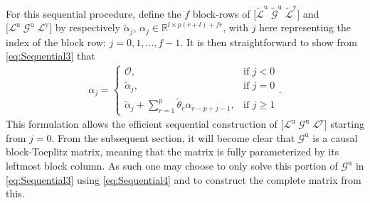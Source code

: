 For this sequential procedure, define the $f$ block-rows of $\big[\widetilde{\mathcal{L}}^\mathrm{u} \; \widetilde{\mathcal{G}}^\mathrm{u} \; \widetilde{\mathcal{L}}^\mathrm{y}\big]$ and $\big[\mathcal{L}^\mathrm{u} \; \mathcal{G}^\mathrm{u} \; \mathcal{L}^\mathrm{y}\big]$ by respectively $\tilde{\alpha}_j$, ${\alpha_j\in\mathbb{R}^{l\times p(r+l)+fr}}$, with $j$ here representing the index of the block row: $j=0,1,\dots,f-1$. It is then straightforward to show from \eqref{eq:Sequential3} that
\begin{align}\label{eq:Sequential4}
    \alpha_j=
    \left\{\begin{array}{ll}
    \mathcal{O},     & \text{if } j<0\\
    \tilde{\alpha}_j,& \text{if } j=0\\
    \tilde{\alpha}_j + \sum\limits_{r=1}^{p}\tilde{\theta}_r\alpha_{r-p+j-1}, & \text{if } j \geq 1
    \end{array}\right..
\end{align}
This formulation allows the efficient sequential construction of $\big[\mathcal{L}^\mathrm{u} \; \mathcal{G}^\mathrm{u} \; \mathcal{L}^\mathrm{y}\big]$ starting from $j=0$. From the subsequent section, it will become clear that $\mathcal{G}^\mathrm{u}$ is a causal block-Toeplitz matrix, meaning that the matrix is fully parameterized by its leftmost block column. As such one may choose to only solve this portion of $\mathcal{G}^\mathrm{u}$ in \eqref{eq:Sequential3} using \eqref{eq:Sequential4} and to construct the complete matrix from this.